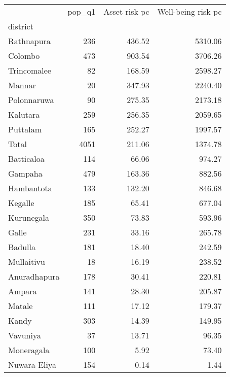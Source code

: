\begin{tabular}{lrrr}
\toprule
{} &  pop\_q1 &  Asset risk pc &  Well-being risk pc \\
district     &         &                &                     \\
\midrule
Rathnapura   &     236 &         436.52 &             5310.06 \\
Colombo      &     473 &         903.54 &             3706.26 \\
Trincomalee  &      82 &         168.59 &             2598.27 \\
Mannar       &      20 &         347.93 &             2240.40 \\
Polonnaruwa  &      90 &         275.35 &             2173.18 \\
Kalutara     &     259 &         256.35 &             2059.65 \\
Puttalam     &     165 &         252.27 &             1997.57 \\
Total        &    4051 &         211.06 &             1374.78 \\
Batticaloa   &     114 &          66.06 &              974.27 \\
Gampaha      &     479 &         163.36 &              882.56 \\
Hambantota   &     133 &         132.20 &              846.68 \\
Kegalle      &     185 &          65.41 &              677.04 \\
Kurunegala   &     350 &          73.83 &              593.96 \\
Galle        &     231 &          33.16 &              265.78 \\
Badulla      &     181 &          18.40 &              242.59 \\
Mullaitivu   &      18 &          16.19 &              238.52 \\
Anuradhapura &     178 &          30.41 &              220.81 \\
Ampara       &     141 &          28.30 &              205.87 \\
Matale       &     111 &          17.12 &              179.37 \\
Kandy        &     303 &          14.39 &              149.95 \\
Vavuniya     &      37 &          13.71 &               96.35 \\
Moneragala   &     100 &           5.92 &               73.40 \\
Nuwara Eliya &     154 &           0.14 &                1.44 \\
\bottomrule
\end{tabular}
